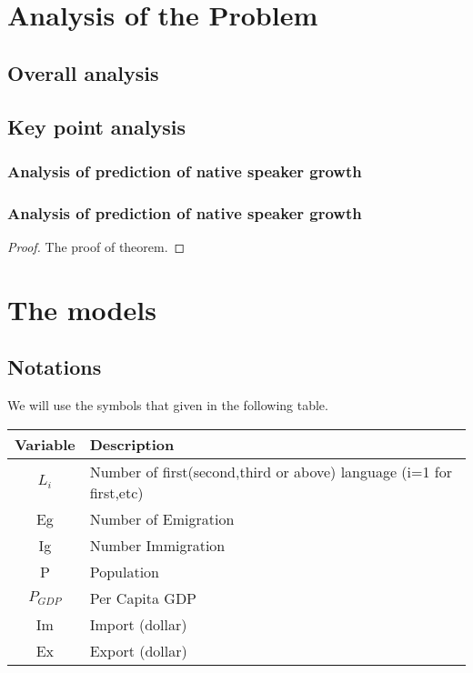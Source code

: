 \documentclass{mcmthesis}
\begin{document}
\section{Analysis of the Problem}
\subsection{Overall analysis}

\subsection{Key point analysis}
\subsubsection{Analysis of prediction of native speaker growth}

\subsubsection{Analysis of prediction of native speaker growth}


\begin{proof}
The proof of theorem.
\end{proof}
\section{The models}
\subsection{Notations}
We will use the symbols that given in the following table.
\begin{table}
\begin{center}
\begin{tabular}{c l}
\hline
\multicolumn{1}{l}{Variable} & Description                                      \\
\hline
$L_i$                            & Number of first(second,third or above) language (i=1 for first,etc)                                       \\
Eg                           &Number of Emigration                                       \\
Ig                           &Number Immigration \\
P                            & Population                                \\
$P_{GDP}   $                         & Per Capita GDP                                   \\
Im                            & Import (dollar)                                       \\
Ex                            & Export (dollar)                                   \\
\hline
\end{tabular}
\end{center}
\end{table}
\end{document}

